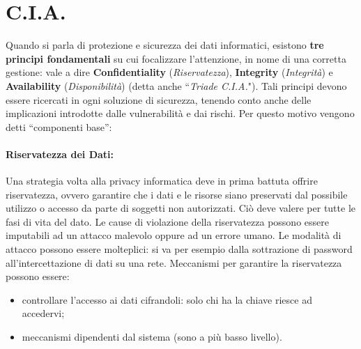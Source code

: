 \section{C.I.A.}

Quando si parla di protezione e sicurezza dei dati informatici,
esistono \textbf{tre principi fondamentali} su cui focalizzare l'attenzione,
in nome di una corretta gestione: vale a
dire \textbf{Confidentiality} (\textit{Riservatezza}),
\textbf{Integrity} (\textit{Integrità}) e
\textbf{Availability} (\textit{Disponibilità})
(detta anche “\textit{Triade C.I.A.}").
Tali principi devono essere ricercati in ogni soluzione di sicurezza, tenendo
conto anche delle implicazioni introdotte dalle vulnerabilità e dai rischi.
Per questo motivo vengono detti “componenti base”:

\paragraph{Riservatezza dei Dati:}

Una strategia volta alla privacy informatica deve in prima battuta offrire
riservatezza, ovvero garantire che i dati e le risorse siano preservati dal
possibile utilizzo o accesso da parte di soggetti non autorizzati.
Ciò deve valere per tutte le fasi di vita del dato.
Le cause di violazione della riservatezza possono essere imputabili ad un attacco
malevolo oppure ad un errore umano. Le modalità di attacco possono essere molteplici:
si va per esempio dalla sottrazione di password all’intercettazione di dati su
una rete. Meccanismi per garantire la riservatezza possono essere:

\begin{itemize}
    \item controllare l'accesso ai dati cifrandoli:
          solo chi ha la chiave riesce ad accedervi;
    \item meccanismi dipendenti dal sistema (sono a più basso livello).
\end{itemize}

